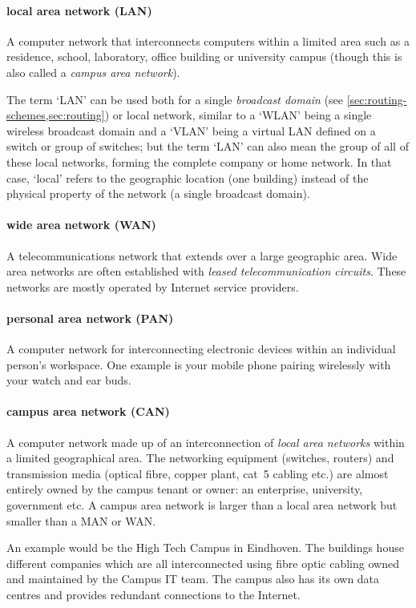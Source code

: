 {\paragraph{local area network (LAN)}
A computer network that interconnects computers within a limited area such as a residence, school, laboratory, office building or university campus (though this is also called a \emph{campus area network}).

The term `LAN' can be used both for a single \emph{broadcast domain} (see \vref{sec:routing-schemes,sec:routing}) or local network, similar to a `WLAN' being a single wireless broadcast domain and a `VLAN' being a virtual LAN defined on a switch or group of switches; but the term `LAN' can also mean the group of all of these local networks, forming the complete company or home network.
In that case, `local' refers to the geographic location (one building) instead of the physical property of the network (a single broadcast domain).

\paragraph{wide area network (WAN)}
A telecommunications network that extends over a large geographic area.
Wide area networks are often established with \emph{leased telecommunication circuits}.
These networks are mostly operated by Internet service providers.

\paragraph{personal area network (PAN)}
A computer network for interconnecting electronic devices within an individual person's workspace.
One example is your mobile phone pairing wirelessly with your watch and ear buds.

\paragraph{campus area network (CAN)}
A computer network made up of an interconnection of \emph{local area networks} within a limited geographical area.
The networking equipment (switches, routers) and transmission media (optical fibre, copper plant, cat~5 cabling etc.) are almost entirely owned by the campus tenant or owner: an enterprise, university, government etc.
A campus area network is larger than a local area network but smaller than a MAN or WAN.

An example would be the High Tech Campus in Eindhoven.
The buildings house different companies which are all interconnected using fibre optic cabling owned and maintained by the Campus IT team.
The campus also has its own data centres and provides redundant connections to the Internet.

}
